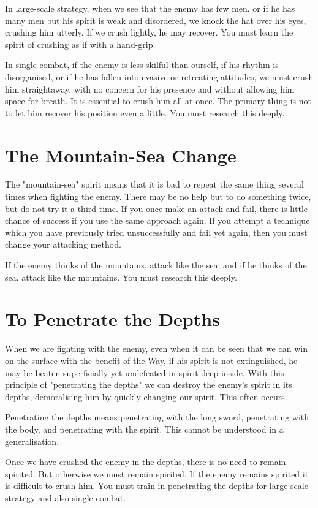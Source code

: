 \documentclass[12pt]{report}
\begin{document}
In large-scale strategy, when we see that the enemy has few men, or if he has many men but his spirit is weak and disordered, we knock the hat over his eyes, crushing him utterly. If we crush lightly, he may recover. You must learn the spirit of crushing as if with a hand-grip.

In single combat, if the enemy is less skilful than ourself, if his rhythm is disorganised, or if he has fallen into evasive or retreating attitudes, we must crush him straightaway, with no concern for his presence and without allowing him space for breath. It is essential to crush him all at once. The primary thing is not to let him recover his position even a little. You must research this deeply.
\section*{The Mountain-Sea Change}
The "mountain-sea" spirit means that it is bad to repeat the same thing several times when fighting the enemy. There may be no help but to do something twice, but do not try it a third time. If you once make an attack and fail, there is little chance of success if you use the same approach again. If you attempt a technique which you have previously tried unsuccessfully and fail yet again, then you must change your attacking method.

If the enemy thinks of the mountains, attack like the sea; and if he thinks of the sea, attack like the mountains. You must research this deeply.
\section*{To Penetrate the Depths}
When we are fighting with the enemy, even when it can be seen that we can win on the surface with the benefit of the Way, if his spirit is not extinguished, he may be beaten superficially yet undefeated in spirit deep inside. With this principle of "penetrating the depths" we can destroy the enemy's spirit in its depths, demoralising him by quickly changing our spirit. This often occurs.

Penetrating the depths means penetrating with the long sword, penetrating with the body, and penetrating with the spirit. This cannot be understood in a generalisation.

Once we have crushed the enemy in the depths, there is no need to remain spirited. But otherwise we must remain spirited. If the enemy remains spirited it is difficult to crush him. You must train in penetrating the depths for large-scale strategy and also single combat.
\clearpage
\end{document}
